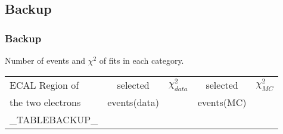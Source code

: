 \subsection{Backup}
\color{titlecolor}

\color{titlecolor}
\begin{frame}
  \frametitle{Backup}
	\vspace{10mm}

 Number of events and $\chi^2$ of fits in each category.

  \begin{center}
    \emph{\dataSample}\xspace \invMassVarName

    \begin{tabular}{|l|c|c|c|c|} \hline
      ECAL Region of & selected  & $ \chi^{2}_{data}$ & selected & $\chi^{2}_{MC}$ \\
      the two electrons & events(data) &  & events(MC) & \\
      \hline
      \hline
      _TABLEBACKUP_
      \hline		
    \end{tabular}
  \end{center}
\end{frame}



